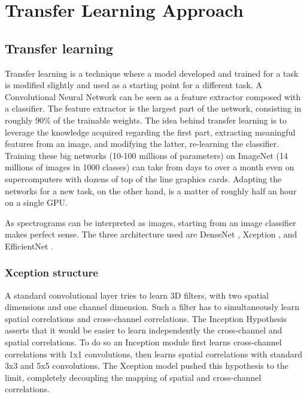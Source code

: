 


\section{Transfer Learning Approach}
\label{sec:transfer_learning}

\subsection{Transfer learning}

Transfer learning is a technique where a model developed and trained for a task
is modified slightly and used as a starting point for a different task.
A Convolutional Neural Network can be seen as a feature extractor composed with
a classifier.
The feature extractor is the largest part of the network, consisting in roughly
90\% of the trainable weights.
The idea behind transfer learning is to leverage the knowledge acquired
regarding the first part, extracting meaningful features from an image, and
modifying the latter, re-learning the classifier.
Training these big networks (10-100 millions of parameters) on ImageNet (14
millions of images in 1000 classes) can take from days to over a month even on
supercomputers with dozens of top of the line graphics cards.
Adapting the networks for a new task, on the other hand, is a matter of roughly
half an hour on a single GPU.

As spectrograms can be interpreted as images, starting from an image classifier
makes perfect sense. The three architecture used are
DenseNet
\cite{huang2018densely},
Xception 
\cite{chollet2017xception},
and
EfficientNet
\cite{tan2020efficientnet}.

\subsubsection{Xception structure}

A standard convolutional layer tries to learn 3D filters, with two spatial
dimensions and one channel dimension.
Such a filter has to simultaneously learn spatial correlations and
cross-channel correlations.
The Inception Hypothesis asserts that it would be easier to learn independently
the cross-channel and spatial correlations.
To do so an Inception module first learns cross-channel correlations with 1x1
convolutions, then learns spatial correlations with standard 3x3 and 5x5
convolutions.
The Xception model pushed this hypothesis to the limit, completely decoupling
the mapping of spatial and cross-channel correlations.

